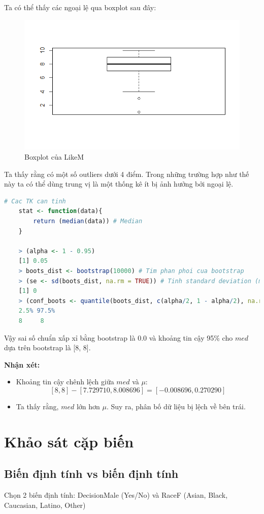 \documentclass[a4paper,12pt]{article}
\begin{document}
\begin{enumerate}[label = \alph*)]
	Ta có thể thấy các ngoại lệ qua boxplot sau đây:
	\begin{figure}[H]
		\centering
		\includegraphics[width=0.7\linewidth]{Rplot3}
		\caption{Boxplot của LikeM}
		\label{fig:rplot1}
	\end{figure}
	
	Ta thấy rằng có một số outliers dưới 4 điểm. Trong những trường hợp như thế này ta có thể dùng trung vị là một thống kê ít bị ảnh hưởng bởi ngoại lệ.
	
	\begin{lstlisting}[language=R]
	# Cac TK can tinh
	stat <- function(data){
		return (median(data)) # Median
	}
	
	> (alpha <- 1 - 0.95)
	[1] 0.05
	> boots_dist <- bootstrap(10000) # Tim phan phoi cua bootstrap
	> (se <- sd(boots_dist, na.rm = TRUE)) # Tinh standard deviation (missing value se bi bo qua)
	[1] 0
	> (conf_boots <- quantile(boots_dist, c(alpha/2, 1 - alpha/2), na.rm = TRUE)) # Tim khoang tin cay cho median
	2.5% 97.5% 
	8     8
	\end{lstlisting}
	Vậy sai số chuẩn xấp xỉ bằng bootstrap là 0.0 và khoảng tin cậy 95\% cho $med$ dựa trên bootstrap
	là [8, 8].
	\end{enumerate}
	\textbf{Nhận xét:}
	\begin{itemize}
		\item Khoảng tin cậy chênh lệch giữa $med$ và $\mu$:
		$$[8, 8] - [7.729710, 8.008696] = [-0.008696, 0.270290]$$
		\item Ta thấy rằng, $med$ lớn hơn $\mu$. Suy ra, phân bố dữ liệu bị lệch về bên trái.
	\end{itemize}
	\section{Khảo sát cặp biến}
	\subsection{Biến định tính vs biến định tính}
	Chọn 2 biến định tính: DecisionMale (Yes/No) và RaceF (Asian, Black, Caucasian, Latino, Other)
	
\end{document}
